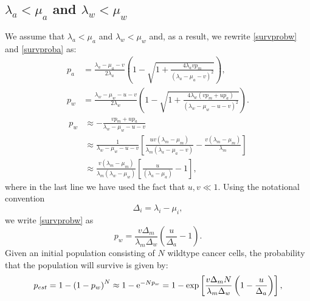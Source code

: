 \documentclass[11pt,a4paper]{article}
\newcommand{\e}{{\rm e}}
\begin{document}
\subsection{$\lambda_a<\mu_a$ and $\lambda_w<\mu_w$}
We assume that $\lambda_a<\mu_a$ and $\lambda_w<\mu_w$ and, as a result, we rewrite \eqref{survprobw} and \eqref{survproba} as:
\begin{align*}
p_a&=\frac{\lambda_a-\mu_a-v}{2\lambda_a}\left(1-\sqrt{1+\frac{4\lambda_avp_m}{\left(\lambda_a-\mu_a-v\right)^2}}\right),\\
p_w&=\frac{\lambda_w-\mu_w-u-v}{2\lambda_w}\left(1-\sqrt{1+\frac{4\lambda_w\left(vp_m+up_a\right)}{\left(\lambda_w-\mu_w-u-v\right)^2}}\right).
\end{align*}
\begin{align}\label{survprobwinitial}
p_w&\approx-\frac{vp_m+up_a}{\lambda_w-\mu_w-u-v}\\
\nonumber
&\approx\frac{1}{\lambda_w-\mu_w-u-v}\left[\frac{uv\left(\lambda_m-\mu_m\right)}{\lambda_m\left(\lambda_a-\mu_a-v\right)}-\frac{v\left(\lambda_m-\mu_m\right)}{\lambda_m}\right]\\ \label{survprobw2}
&\approx\frac{v\left(\lambda_m-\mu_m\right)}{\lambda_m\left(\lambda_w-\mu_w\right)}\left[\frac{u}{\left(\lambda_a-\mu_a\right)}-1\right],
\end{align}
where in the last line we have used the fact that $u,v\ll1$. Using the notational convention
\begin{equation}\label{notationalconv}
\Delta_i=\lambda_i-\mu_i,
\end{equation}
we write \eqref{survprobw} as
\begin{equation}\label{survprobwapprox}
p_w=\frac{v\Delta_m}{\lambda_m\Delta_w}\left(\frac{u}{\Delta_a}-1\right).
\end{equation}
Given an initial population consisting of $N$ wildtype cancer cells, the probability that the population will survive is given by: 
\begin{align}\label{AneuploidyDeleteriousApprox}
p_{est}=1-\left(1-p_w\right)^N\approx 1-\e^{-Np_w}=1-\exp\left[\frac{v\Delta_mN}{\lambda_m\Delta_w}\left(1-\frac{u}{\Delta_a}\right)\right],
\end{align}
\end{document}
